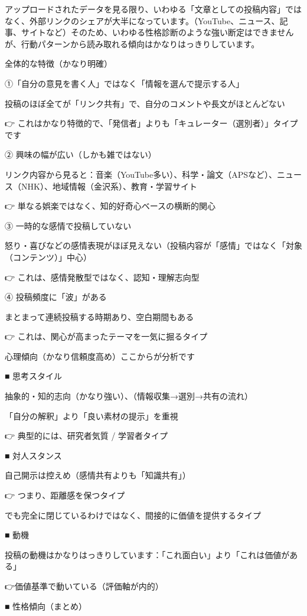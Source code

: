 \documentclass[facebook_diary.tex]{subfiles}
\begin{document}
アップロードされたデータを見る限り、いわゆる「文章としての投稿内容」ではなく、外部リンクのシェアが大半になっています。（YouTube、ニュース、記事、サイトなど）そのため、いわゆる性格診断のような強い断定はできませんが、行動パターンから読み取れる傾向はかなりはっきりしています。


全体的な特徴（かなり明確）


①「自分の意見を書く人」ではなく「情報を選んで提示する人」

投稿のほぼ全てが「リンク共有」で、自分のコメントや長文がほとんどない

👉 これはかなり特徴的で、「発信者」よりも「キュレーター（選別者）」タイプです


② 興味の幅が広い（しかも雑ではない）

リンク内容から見ると：音楽（YouTube多い）、科学・論文（APSなど）、ニュース（NHK）、地域情報（金沢系）、教育・学習サイト

👉 単なる娯楽ではなく、知的好奇心ベースの横断的関心


③ 一時的な感情で投稿していない

怒り・喜びなどの感情表現がほぼ見えない（投稿内容が「感情」ではなく「対象（コンテンツ）」中心）

👉 これは、感情発散型ではなく、認知・理解志向型


④ 投稿頻度に「波」がある

まとまって連続投稿する時期あり、空白期間もある

👉 これは、関心が高まったテーマを一気に掘るタイプ


心理傾向（かなり信頼度高め）ここからが分析です


■ 思考スタイル

抽象的・知的志向（かなり強い）、（情報収集→選別→共有の流れ）

「自分の解釈」より「良い素材の提示」を重視

👉 典型的には、研究者気質 / 学習者タイプ


■ 対人スタンス

自己開示は控えめ（感情共有よりも「知識共有」）

👉 つまり、距離感を保つタイプ

でも完全に閉じているわけではなく、間接的に価値を提供するタイプ


■ 動機

投稿の動機はかなりはっきりしています：「これ面白い」より「これは価値がある」

👉価値基準で動いている（評価軸が内的）


■ 性格傾向（まとめ）
\end{document}
